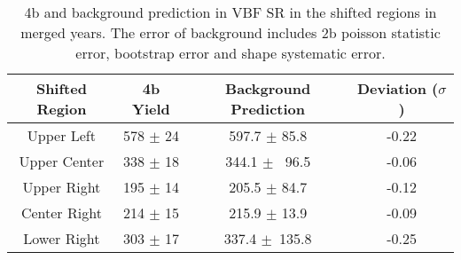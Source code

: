 \begin{table}[ht]
    \centering
    \caption{\label{tbl:shifted-4bvbf-yields} 4b and background prediction in VBF SR in the shifted 
             regions in merged years. The error of background includes 2b poisson statistic error, 
             bootstrap error and shape systematic error.}
    \setlength\extrarowheight{5pt}
    \begin{tabular}{cccc}
        \toprule
            Shifted Region & 4b Yield & Background Prediction & Deviation ($\sigma$) \\
        \midrule
            Upper Left   & 578 $\pm$ 24 & 597.7 $\pm$  85.8 & -0.22 \\
            Upper Center & 338 $\pm$ 18 & 344.1 $\pm$  96.5 & -0.06 \\
            Upper Right  & 195 $\pm$ 14 & 205.5 $\pm$  84.7 & -0.12 \\
            Center Right & 214 $\pm$ 15 & 215.9 $\pm$  13.9 & -0.09 \\
            Lower Right  & 303 $\pm$ 17 & 337.4 $\pm$ 135.8 & -0.25 \\
        \bottomrule
    \end{tabular}
\end{table}
\FloatBarrier
